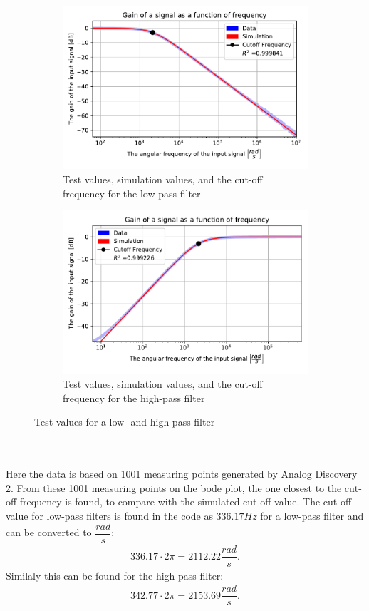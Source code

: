 \begin{figure}[htbp]
\centering
	\begin{subfigure}[b]{0.49\textwidth}
		\includegraphics[width=\textwidth]{fig/img/LPF_exp.pdf}
    		\caption{Test values, simulation values, and the cut-off frequency for the low-pass filter}
    		\label{fig:lpf:exp}
	\end{subfigure}
	\begin{subfigure}[b]{0.49\textwidth}
		\includegraphics[width=\textwidth]{fig/img/HPF_exp.pdf}
    		\caption{Test values, simulation values, and the cut-off frequency for the high-pass filter}
    		\label{fig:hpf:exp}
	\end{subfigure}
	\caption{Test values for a low- and high-pass filter}
\end{figure}
\\ \\
Here the data is based on 1001 measuring points generated by Analog Discovery 2. From these 1001 measuring points on the bode plot, the one closest to the cut-off frequency is found, to compare with the simulated cut-off value. The cut-off value for low-pass filters is found in the code as $336.17 Hz$ for a low-pass filter and can be converted to $\dfrac{rad}{s}$:
\begin{align}
336.17 \cdot 2 \pi = 2112.22 \dfrac{rad}{s}.
 \label{lpf:cut}
\end{align}
Similaly this can be found for the high-pass filter:
\begin{align}
342.77 \cdot 2 \pi = 2153.69 \dfrac{rad}{s}.
 \label{hpf:cut}
\end{align}
